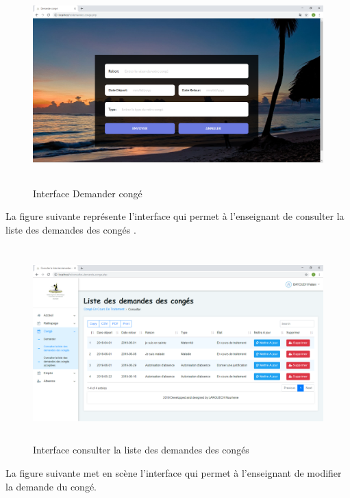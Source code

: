 \documentclass[12 pt ]{report}
\begin{document}
\begin{figure}[h]
 \begin{center}
\includegraphics[width= 15 cm ,height=  7.7cm]{demander_conge.PNG}
\caption{Interface Demander congé}

\end{center}
\end{figure}
\newpage
La figure suivante représente l'interface qui permet à l'enseignant de consulter la liste des demandes des congés .

\begin{figure}[h]
 \begin{center}
\includegraphics[width= 18 cm ,height=  7.5cm]{consulter_demande_conge.PNG}
\caption{Interface consulter la liste des demandes des congés}

\end{center}
\end{figure}

La figure suivante met en scène l'interface qui permet à l'enseignant de modifier la demande du congé.
\end{document}
